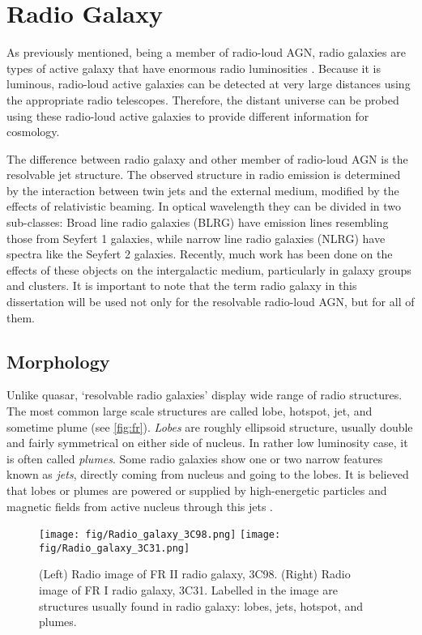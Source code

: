 \section{Radio Galaxy}

As previously mentioned, being a member of radio-loud AGN, radio galaxies are types of active galaxy that have enormous radio luminosities \citep[e.g.][]{miley2008, netzer2013, heckman2014}. Because it is luminous, radio-loud active galaxies can be detected at very large distances using the appropriate radio telescopes. Therefore, the distant universe can be probed using these radio-loud active galaxies to provide different information for cosmology. 

The difference between radio galaxy and other member of radio-loud AGN is the resolvable jet structure. The observed structure in radio emission is determined by the interaction between twin jets and the external medium, modified by the effects of relativistic beaming. In optical wavelength they can be divided in two sub-classes: Broad line radio galaxies (BLRG) have emission lines resembling those from Seyfert 1 galaxies, while narrow line radio galaxies (NLRG) have spectra like the Seyfert 2 galaxies. Recently, much work has been done on the effects of these objects on the intergalactic medium, particularly in galaxy groups and clusters. It is important to note that the term radio galaxy in this dissertation will be used not only for the resolvable radio-loud AGN, but for all of them.

\subsection{Morphology}

Unlike quasar, `resolvable radio galaxies' display wide range of radio structures. The most common large scale structures are called lobe, hotspot, jet, and sometime plume (see \autoref{fig:fr}). \textit{Lobes} are roughly ellipsoid structure, usually double and fairly symmetrical on either side of nucleus. In rather low luminosity case, it is often called \textit{plumes}. Some radio galaxies show one or two narrow features known as \textit{jets}, directly coming from nucleus and going to the lobes. It is believed that lobes or plumes are powered or supplied by high-energetic particles and magnetic fields from active nucleus through this jets \citep[see, e.g., ][]{scheuer1974, blandford1974}.

\begin{figure}[!ht]
\centering
\texttt{[image: fig/Radio\_galaxy\_3C98.png]}
\texttt{[image: fig/Radio\_galaxy\_3C31.png]}
\caption[Example of radio image for the FR I and FR II radio galaxy]{(Left) Radio image of FR II radio galaxy, 3C98. (Right) Radio image of FR I radio galaxy, 3C31. Labelled in the image are structures usually found in radio galaxy: lobes, jets, hotspot, and plumes.}
\label{fig:fr}
\end{figure}

